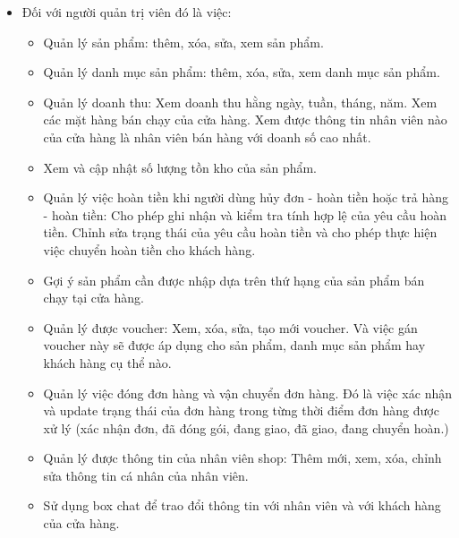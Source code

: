 \begin{itemize}
  \item Đối với người quản trị viên đó là việc:
        \begin{itemize}
          \item Quản lý sản phẩm: thêm, xóa, sửa, xem sản phẩm.
          \item Quản lý danh mục sản phẩm: thêm, xóa, sửa, xem danh mục sản phẩm.
          \item Quản lý doanh thu: Xem doanh thu hằng ngày, tuần, tháng, năm. Xem các mặt hàng bán chạy của cửa hàng. Xem được thông tin nhân viên nào của cửa hàng là nhân viên bán hàng với doanh số cao nhất.
          \item Xem và cập nhật số lượng tồn kho của sản phẩm.
          \item Quản lý việc hoàn tiền khi người dùng hủy đơn - hoàn tiền hoặc trả hàng - hoàn tiền: Cho phép ghi nhận và kiểm tra tính hợp lệ của yêu cầu hoàn tiền. Chỉnh sửa trạng thái của yêu cầu hoàn tiền và cho phép thực hiện việc chuyển hoàn tiền cho khách hàng.
          \item Gợi ý sản phẩm cần được nhập dựa trên thứ hạng của sản phẩm bán chạy tại cửa hàng.
          \item Quản lý được voucher: Xem, xóa, sửa, tạo mới voucher. Và việc gán voucher này sẽ được áp dụng cho sản phẩm, danh mục sản phẩm hay khách hàng cụ thể nào.
          \item Quản lý việc đóng đơn hàng và vận chuyển đơn hàng. Đó là việc xác nhận và update trạng thái của đơn hàng trong từng thời điểm đơn hàng được xử lý (xác nhận đơn, đã đóng gói, đang giao, đã giao, đang chuyển hoàn.)
          \item Quản lý được thông tin của nhân viên shop: Thêm mới, xem, xóa, chỉnh sửa thông tin cá nhân của nhân viên.
          \item Sử dụng box chat để trao đổi thông tin với nhân viên và với khách hàng của cửa hàng.
        \end{itemize}


\end{itemize}
